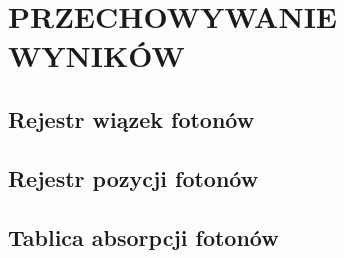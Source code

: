\chapter{PRZECHOWYWANIE WYNIKÓW}
\label{chpt:przechowywanie-wyników}
\section{Rejestr wiązek fotonów}
\section{Rejestr pozycji fotonów}
\section{Tablica absorpcji fotonów}
